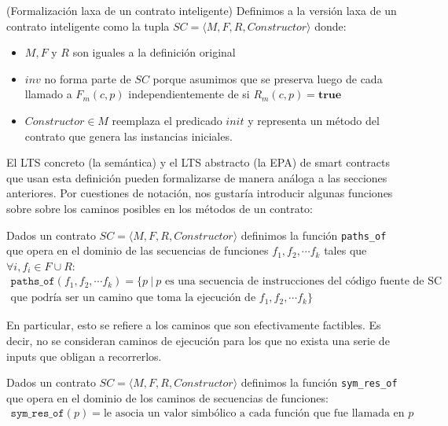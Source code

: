 \begin{definition}(Formalización laxa de un contrato inteligente)
    \label{definicion-laxa-smart-contract}
    Definimos a la versión laxa de un contrato inteligente como la tupla $SC = \langle M, F, R, Constructor \rangle$ donde:
    \begin{itemize}
        \item $M, F$ y $R$ son iguales a la definición original
        \item $inv$ no forma parte de $SC$ porque asumimos que se preserva luego de cada llamado a $F_m(c,p)$ independientemente de si $R_m(c,p) = \textbf{true}$
        \item $Constructor \in M$ reemplaza el predicado $init$ y representa un método del contrato que genera las instancias iniciales.
    \end{itemize}
\end{definition}
El LTS concreto (la semántica) y el LTS abstracto (la EPA) de smart contracts que usan esta definición pueden formalizarse de manera análoga a las secciones anteriores.
Por cuestiones de notación, nos gustaría introducir algunas funciones sobre sobre los caminos posibles en los métodos de un contrato:
\begin{definition}
    Dados un contrato $SC = \langle M, F, R, Constructor \rangle$ definimos la función \texttt{paths\_of} que opera en el dominio de las secuencias de funciones $f_1, f_2, \cdots f_k$ tales que $\forall i, f_i \in F \cup R$:
    \begin{multline}
        \texttt{paths\_of}(f_1, f_2, \cdots f_k) = \{p \: | \: p \text{ es una secuencia de instrucciones del código fuente de SC} \\
        \text{que podría ser un camino que toma la ejecución de } f_1, f_2, \cdots f_k \}
    \end{multline}
\end{definition}
En particular, esto se refiere a los caminos que son efectivamente factibles.
Es decir, no se consideran caminos de ejecución para los que no exista una serie de inputs que obligan a recorrerlos.
\begin{definition}
    Dados un contrato $SC = \langle M, F, R, Constructor \rangle$ definimos la función \texttt{sym\_res\_of} que opera en el dominio de los caminos de secuencias de funciones:
    \begin{multline}
        \texttt{sym\_res\_of}(p) = \text{le asocia un valor simbólico a cada función que fue llamada en }p
    \end{multline}
\end{definition}

